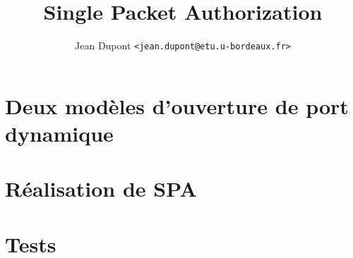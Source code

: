 \documentclass[oneside]{memoir}
\title{Single Packet Authorization}
\author{Jean Dupont \texttt{<jean.dupont@etu.u-bordeaux.fr>}}
\begin{document}
\frontmatter%
\maketitle
\clearpage

\tableofcontents*



\mainmatter%
\part{Deux modèles d'ouverture de port dynamique}




\part{Réalisation de SPA}




\part{Tests}








%
%


\backmatter%

\nocite{*}



\printindex
\end{document}
